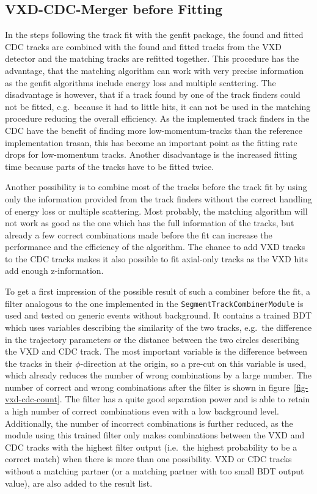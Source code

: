 \subsection{VXD-CDC-Merger before Fitting}
In the steps following the track fit with the genfit package, the found and fitted CDC tracks are combined with the found and fitted tracks from the VXD detector and the matching tracks are refitted together. This procedure has the advantage, that the matching algorithm can work with very precise information as the genfit algorithms include energy loss and multiple scattering. The disadvantage is however, that if a track found by one of the track finders could not be fitted, e.g.\ because it had to little hits, it can not be used in the matching procedure reducing the overall efficiency. As the implemented track finders in the CDC have the benefit of finding more low-momentum-tracks than the reference implementation trasan, this has become an important point as the fitting rate drops for low-momentum tracks. Another disadvantage is the increased fitting time because parts of the tracks have to be fitted twice.

Another possibility is to combine most of the tracks before the track fit by using only the information provided from the track finders without the correct handling of energy loss or multiple scattering. Most probably, the matching algorithm will not work as good as the one which has the full information of the tracks, but already a few correct combinations made before the fit can increase the performance and the efficiency of the algorithm. The chance to add VXD tracks to the CDC tracks makes it also possible to fit axial-only tracks as the VXD hits add enough z-information. 

To get a first impression of the possible result of such a combiner before the fit, a filter analogous to the one implemented in the \texttt{SegmentTrackCombinerModule} is used and tested on generic events without background. It contains a trained BDT which uses variables describing the similarity of the two tracks, e.g.\ the difference in the trajectory parameters or the distance between the two circles describing the VXD and CDC track. The most important variable is the difference between the tracks in their $\phi$-direction at the origin, so a pre-cut on this variable is used, which already reduces the number of wrong combinations by a large number. The number of correct and wrong combinations after the filter is shown in figure~\ref{fig-vxd-cdc-count}. The filter has a quite good separation power and is able to retain a high number of correct combinations even with a low background level. Additionally, the number of incorrect combinations is further reduced, as the module using this trained filter only makes combinations between the VXD and CDC tracks with the highest filter output (i.e.\ the highest probability to be a correct match) when there is more than one possibility. VXD or CDC tracks without a matching partner (or a matching partner with too small BDT output value), are also added to the result list. 

